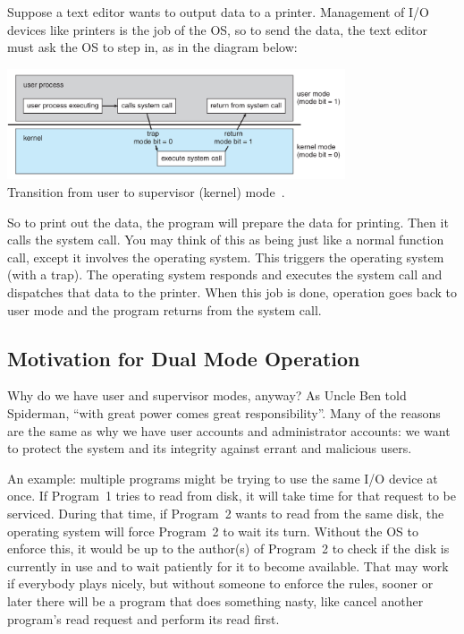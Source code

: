 \documentclass[a4paper]{report}
\begin{document}
Suppose a text editor wants to output data to a printer. Management of I/O devices like printers is the job of the OS, so to send the data, the text editor must ask the OS to step in, as in the diagram below:

\begin{center}
	\includegraphics[width=0.75\textwidth]{images/trap.png}\\
	Transition from user to supervisor (kernel) mode~\cite{osc}.
\end{center}


So to print out the data, the program will prepare the data for printing. Then it calls the system call. You may think of this as being just like a normal function call, except it involves the operating system. This triggers the operating system (with a trap). The operating system responds and executes the system call and dispatches that data to the printer. When this job is done, operation goes back to user mode and the program returns from the system call.

\subsection*{Motivation for Dual Mode Operation}

Why do we have user and supervisor modes, anyway? As Uncle Ben told Spiderman, ``with great power comes great responsibility''. Many of the reasons are the same as why we have user accounts and administrator accounts: we want to protect the system and its integrity against errant and malicious users.

An example: multiple programs might be trying to use the same I/O device at once. If Program~1 tries to read from disk, it will take time for that request to be serviced. During that time, if Program~2 wants to read from the same disk, the operating system will force Program~2 to wait its turn. Without the OS to enforce this, it would be up to the author(s) of Program~2 to check if the disk is currently in use and to wait patiently for it to become available. That may work if everybody plays nicely, but without someone to enforce the rules, sooner or later there will be a program that does something nasty, like cancel another program's read request and perform its read first.
\end{document}
